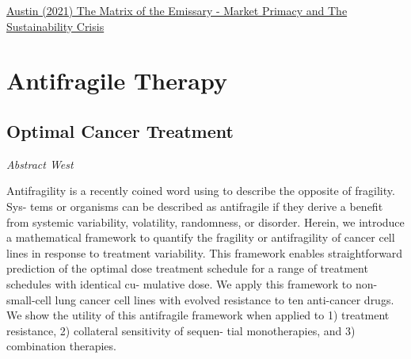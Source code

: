 \documentclass[
]{book}
\begin{document}
\href{https://channelmcgilchrist.com/articles/the-matrix-of-the-emissary/}{Austin (2021) The Matrix of the Emissary - Market Primacy and The Sustainability Crisis}

\hypertarget{antifragile-therapy}{%
\chapter{Antifragile Therapy}\label{antifragile-therapy}}

\hypertarget{optimal-cancer-treatment}{%
\section{Optimal Cancer Treatment}\label{optimal-cancer-treatment}}

\emph{Abstract West}

Antifragility is a recently coined word using to describe the opposite of fragility. Sys-
tems or organisms can be described as antifragile if they derive a benefit from systemic
variability, volatility, randomness, or disorder. Herein, we introduce a mathematical
framework to quantify the fragility or antifragility of cancer cell lines in response
to treatment variability. This framework enables straightforward prediction of the
optimal dose treatment schedule for a range of treatment schedules with identical cu-
mulative dose. We apply this framework to non-small-cell lung cancer cell lines with
evolved resistance to ten anti-cancer drugs. We show the utility of this antifragile
framework when applied to 1) treatment resistance, 2) collateral sensitivity of sequen-
tial monotherapies, and 3) combination therapies.
\end{document}
